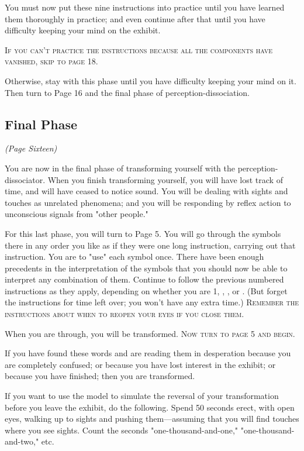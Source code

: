 You must now put these nine instructions into practice until you have 
learned them thoroughly in practice; and even continue after that until you 
have difficulty keeping your mind on the exhibit. 

\textsc{If you can't practice the instructions because all the components have vanished, skip to page 18.}

Otherwise, stay with this phase until you have difficulty keeping your 
mind on it. Then turn to Page 16 and the final phase of 
perception-dissociation. 

\clearpage

\subsection*{Final Phase}
\emph{(Page Sixteen)}

You are now in the final phase of transforming yourself with the 
perception-dissociator. When you finish transforming yourself, you will have 
lost track of time, and will have ceased to notice sound. You will be dealing 
with sights and touches as unrelated phenomena; and you will be responding 
by reflex action to unconscious signals from "other people." 

For this last phase, you will turn to Page 5. You will go through the 
symbols there in any order you like as if they were one long instruction, 
carrying out that instruction. You are to "use" each symbol once. There 
have been enough precedents in the interpretation of the symbols that you 
should now be able to interpret any combination of them. Continue to 
follow the previous numbered instructions as they apply, depending on 
whether you are 1, , , or . 
(But forget the instructions for time left 
over; you won't have any extra time.) 
\textsc{Remember the instructions about when to reopen your eyes if you close them.}

When you are through, you will be transformed. 
\textsc{Now turn to page 5 and begin.}

\clearpage

If you have found these words and are reading them in desperation 
because you are completely confused; or because you have lost interest in 
the exhibit; or because you have finished; then you are transformed. 


If you want to use the model to simulate the reversal of your 
transformation before you leave the exhibit, do the following. Spend 50 
seconds erect, with open eyes, walking up to sights and pushing 
them---assuming that you will find touches where you see sights. Count the 
seconds "one-thousand-and-one," "one-thousand-and-two," etc. 



